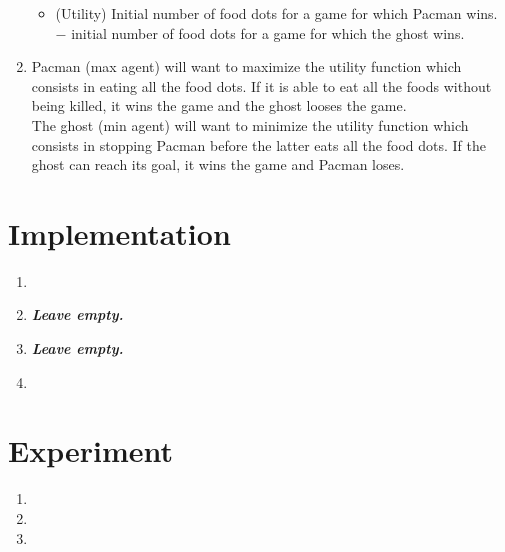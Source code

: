 \documentclass{article}
\begin{document}
\begin{enumerate}[label=\alph*.,leftmargin=*]
\begin{itemize}
			\item (Utility) Initial number of food dots for a game for which Pacman wins.\\\hspace*{1.2cm}
			$-$ initial number of food dots for a game for which the ghost wins.
    	\end{itemize}
    	
    \item Pacman (max agent) will want to maximize the utility function which consists in eating all the food dots. If it is able to eat all the foods without being killed, it wins the game and the ghost looses the game.\\
    The ghost (min agent) will want to minimize the utility function which consists in stopping Pacman before the latter eats all the food dots. If the ghost can reach its goal, it wins the game and Pacman loses.\\
\end{enumerate}

\section{Implementation}

\begin{enumerate}[label=\alph*.,leftmargin=*]
    \item
    \item \textbf{\textit{Leave empty.}}
    \item \textbf{\textit{Leave empty.}}
    \item
\end{enumerate}

\section{Experiment}

\begin{enumerate}[label=\alph*.,leftmargin=*]
    \item
    \item
    \item
\end{enumerate}



\end{document}
